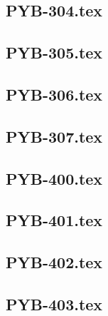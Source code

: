 \renewcommand{\xxexo}{PYB-304.tex} 
\subsection*{\xxexo} 
\graphicspath{{../../exos/python_bases/PYB-304/}}
 
 
\renewcommand{\xxexo}{PYB-305.tex} 
\subsection*{\xxexo} 
\graphicspath{{../../exos/python_bases/PYB-305/}}
 
 
\renewcommand{\xxexo}{PYB-306.tex} 
\subsection*{\xxexo} 
\graphicspath{{../../exos/python_bases/PYB-306/}}
 
 
\renewcommand{\xxexo}{PYB-307.tex} 
\subsection*{\xxexo} 
\graphicspath{{../../exos/python_bases/PYB-307/}}
 
 
\renewcommand{\xxexo}{PYB-400.tex} 
\subsection*{\xxexo} 
\graphicspath{{../../exos/python_bases/PYB-400/}}
 
 
\renewcommand{\xxexo}{PYB-401.tex} 
\subsection*{\xxexo} 
\graphicspath{{../../exos/python_bases/PYB-401/}}
 
 
\renewcommand{\xxexo}{PYB-402.tex} 
\subsection*{\xxexo} 
\graphicspath{{../../exos/python_bases/PYB-402/}}
 
 
\renewcommand{\xxexo}{PYB-403.tex} 
\subsection*{\xxexo} 
\graphicspath{{../../exos/python_bases/PYB-403/}}
 
 
